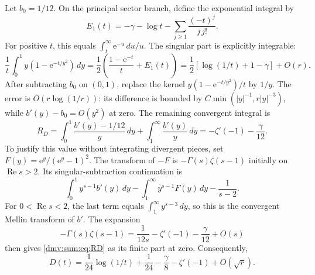 \documentclass[11pt,letterpaper]{article}
\numberwithin{equation}{section}
\theoremstyle{definition}\newtheorem{definition}[theorem]{Definition}
\theoremstyle{remark}\newtheorem{remark}[theorem]{Remark}
\newcommand{\ee}{\mathrm e}
\DeclareMathOperator{\Rea}{Re}
\begin{document}
Let $b_0=1/12$. On the principal sector branch, define the exponential integral by
\[
 E_1(t)=-\gamma-\log t-\sum_{j\ge1}\frac{(-t)^j}{j\,j!}.
\]
For positive $t$, this equals $\int_t^\infty \ee^{-u}\,du/u$. The singular part is explicitly integrable:
\begin{equation}\label{dmv:sum:eq:E1}
 \frac1t\int_0^1y(1-\ee^{-t/y^2})\,dy
 =\frac12\left(\frac{1-\ee^{-t}}t+E_1(t)\right)
 =\frac12[\log(1/t)+1-\gamma]+O(r).
\end{equation}
After subtracting $b_0$ on $(0,1)$, replace the kernel $y(1-\ee^{-t/y^2})/t$ by $1/y$. The error is $O(r\log(1/r))$: its difference is bounded by $C\min(|y|^{-1},r|y|^{-3})$, while $b'(y)-b_0=O(y^2)$ at zero. The remaining convergent integral is
\begin{equation}\label{dmv:sum:eq:RD}
 R_D=\int_0^1\frac{b'(y)-1/12}{y}\,dy+\int_1^\infty\frac{b'(y)}y\,dy
       =-\zeta'(-1)-\frac\gamma{12}.
\end{equation}
To justify this value without integrating divergent pieces, set $F(y)=\ee^y/(\ee^y-1)^2$. The transform of $-F$ is $-\Gamma(s)\zeta(s-1)$ initially on $\Rea s>2$. Its singular-subtraction continuation is
\[
 \int_0^1y^{s-1}b'(y)\,dy-\int_1^\infty y^{s-1}F(y)\,dy-\frac1{s-2}.
\]
For $0<\Rea s<2$, the last term equals $\int_1^\infty y^{s-3}\,dy$, so this is the convergent Mellin transform of $b'$. The expansion
\[
 -\Gamma(s)\zeta(s-1)=\frac1{12s}-\zeta'(-1)-\frac\gamma{12}+O(s)
\]
then gives \eqref{dmv:sum:eq:RD} as its finite part at zero. Consequently,
\begin{equation}\label{dmv:sum:eq:D}
 D(t)=\frac1{24}\log(1/t)+\frac1{24}-\frac\gamma8-\zeta'(-1)+O(\sqrt r).
\end{equation}
\end{document}

